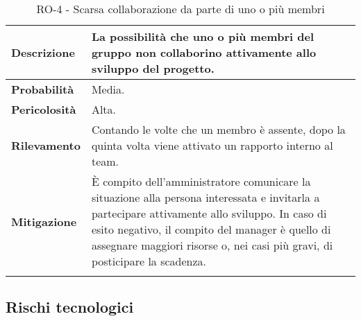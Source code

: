 \begin{longtable}{ | l | p{12cm} | }
	\hline
	\textbf{Descrizione}  & La possibilità che uno o più membri del gruppo non collaborino attivamente allo sviluppo del progetto.                                                                                                                                                                           \\
	\hline
	\textbf{Probabilità}  & Media.                                                                                                                                                                                                                                                                           \\
	\hline
	\textbf{Pericolosità} & Alta.                                                                                                                                                                                                                                                                            \\
	\hline
	\textbf{Rilevamento}  & Contando le volte che un membro è assente, dopo la quinta volta viene attivato un rapporto interno al team.                                                                                                                                                                      \\
	\hline
	\textbf{Mitigazione}  & È compito dell'amministratore comunicare la situazione alla persona interessata e invitarla a partecipare attivamente allo sviluppo. In caso di esito negativo, il compito del manager è quello di assegnare maggiori risorse o, nei casi più gravi, di posticipare la scadenza. \\
	\hline
	\caption{RO-4 - Scarsa collaborazione da parte di uno o più membri}
\end{longtable}



\subsection{Rischi tecnologici}


